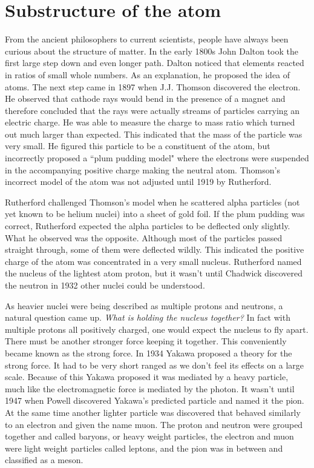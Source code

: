 \documentclass[abstract = on,listof=totoc, bibliography=totoc]{scrreprt}
\begin{document}
\section{Substructure of the atom}

From the ancient philosophers to current scientists, people have always been curious about the structure of matter. In the early 1800s John Dalton took the first large step down and even longer path. Dalton noticed that elements reacted in ratios of small whole numbers. As an explanation, he proposed the idea of atoms. The next step came in 1897 when J.J. Thomson discovered the electron. He observed that cathode rays would bend in the presence of a magnet and therefore concluded that the rays were actually streams of particles carrying an electric charge. He was able to measure the charge to mass ratio which turned out much larger than expected. This indicated that the mass of the particle was very small. He figured this particle to be a constituent of the atom, but incorrectly proposed a ``plum pudding model" where the electrons were suspended in the accompanying positive charge making the neutral atom. Thomson's incorrect model of the atom was not adjusted until 1919 by Rutherford.

Rutherford challenged Thomson's model when he scattered alpha particles (not yet known to be helium nuclei) into a sheet of gold foil. If the plum pudding was correct, Rutherford expected the alpha particles to be deflected only slightly. What he observed was the opposite. Although most of the particles passed straight through, some of them were deflected wildly. This indicated the positive charge of the atom was concentrated in a very small nucleus. Rutherford named the nucleus of the lightest atom proton, but it wasn't until Chadwick discovered the neutron in 1932 other nuclei could be understood.\cite{IEP}

As heavier nuclei were being described as multiple protons and neutrons, a natural question came up. \textit{What is holding the nucleus together?} In fact with multiple protons all positively charged, one would expect the nucleus to fly apart. There must be another stronger force keeping it together. This conveniently became known as the strong force. In 1934 Yakawa proposed a theory for the strong force. It had to be very short ranged as we don't feel its effects on a large scale. Because of this Yakawa proposed it was mediated by a heavy particle, much like the electromagnetic force is mediated by the photon.  It wasn't until 1947 when Powell discovered Yakawa's predicted particle and named it the pion. At the same time another lighter particle was discovered that behaved similarly to an electron and given the name muon. The proton and neutron were grouped together and called baryons, or heavy weight particles, the electron and muon were light weight particles called leptons, and the pion was in between and classified as a meson.\cite{IEP}  
\end{document}
